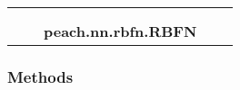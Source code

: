     \label{peach:nn:rbfn:RBFN}
\begin{tabular}{cccccc}
\multicolumn{2}{r}{\settowidth{\BCL}{object}\multirow{2}{\BCL}{object}}
&&
  \\\cline{3-3}
  &&\multicolumn{1}{c|}{}
&&
  \\
&&\multicolumn{2}{l}{\textbf{peach.nn.rbfn.RBFN}}
\end{tabular}



  \subsubsection{Methods}

    \vspace{0.5ex}

